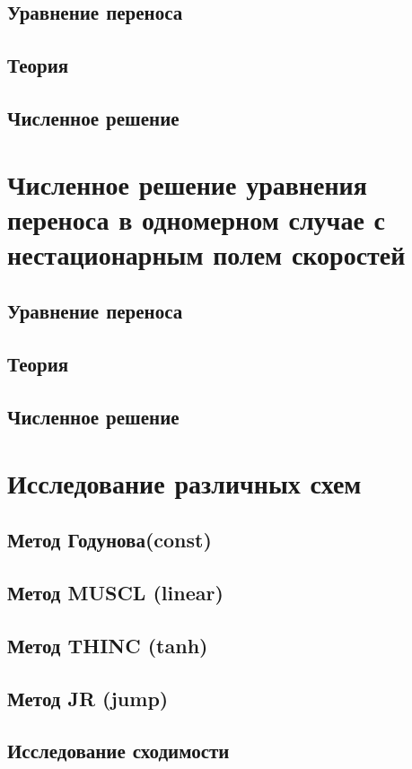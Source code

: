 \documentclass[12pt,a4paper]{article}
\begin{document}
\subsection{Уравнение переноса}
\subsection{Теория}
\subsection{Численное решение}

\section{Численное решение уравнения переноса в одномерном случае с нестационарным полем скоростей}
\subsection{Уравнение переноса}
\subsection{Теория}
\subsection{Численное решение}

\section{Исследование различных схем}
\subsection{Метод Годунова(const)}
\subsection{Метод MUSCL (linear)}
\subsection{Метод THINC (tanh)}
\subsection{Метод JR (jump)}
\subsection{Исследование сходимости}
\end{document}
